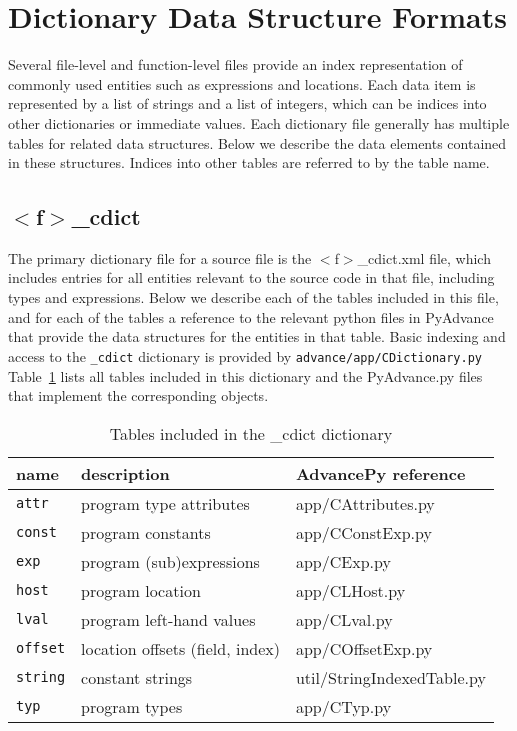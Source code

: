\documentclass[11pt]{article}
\newcommand\fname{$<$f$>$}
\begin{document}
\section{Dictionary Data Structure Formats}

Several file-level and function-level files provide an index representation
of commonly used entities such as expressions and locations. Each data item is
represented by a list of strings and a list of integers, which can be indices
into other dictionaries or immediate values. Each dictionary file generally
has multiple tables for related data structures. Below we describe the
data elements contained in these structures. Indices into other tables are
referred to by the table name.

\subsection{\fname\_cdict}

The primary dictionary file for a source file is the \fname\_cdict.xml file,
which includes entries for all entities relevant to the source code in that
file, including types and expressions. Below we describe each of the tables
included in this file, and for each of the tables a reference to the relevant
python files in PyAdvance that provide the data structures for the entities
in that table. Basic indexing and access to the {\tt \_cdict} dictionary is 
provided by {\tt advance/app/CDictionary.py} Table~\ref{tab:cdict} lists all
tables included in this dictionary and the PyAdvance.py files that implement
the corresponding objects.

\begin{table}
\centering
\begin{tabular}{l|l|l}
name & description & AdvancePy reference\\  \hline
{\tt attr} & program type attributes & app/CAttributes.py \\
{\tt const} & program constants & app/CConstExp.py\\
{\tt exp} & program (sub)expressions & app/CExp.py \\
{\tt host} & program location & app/CLHost.py \\
{\tt lval} & program left-hand values & app/CLval.py\\
{\tt offset} & location offsets (field, index) & app/COffsetExp.py \\
{\tt string} & constant strings & util/StringIndexedTable.py \\
{\tt typ} & program types & app/CTyp.py \\
\end{tabular}
\caption{\label{tab:cdict}Tables included in the \_cdict dictionary}
\end{table}
\end{document}

